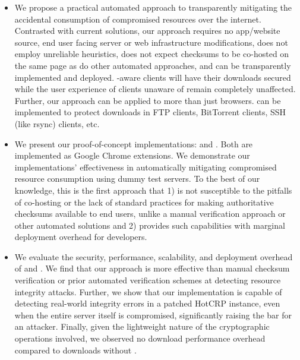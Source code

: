\begin{itemize}

  \item We propose a practical automated approach to transparently mitigating
  the accidental consumption of compromised resources over the internet.
  Contrasted with current solutions, our approach requires no app/website
  source, end user facing server or web infrastructure modifications, does not
  employ unreliable heuristics, does not expect checksums to be co-hosted on the
  same page as do other automated approaches, and can be transparently
  implemented and deployed. \SYSTEM{}-aware clients will have their downloads
  secured while the user experience of clients unaware of \SYSTEM{} remain
  completely unaffected. Further, our approach can be applied to more than just
  browsers. \SYSTEM{} can be implemented to protect downloads in FTP clients,
  BitTorrent clients, SSH (like rsync) clients, etc.

  \item We present our proof-of-concept \SYSTEM{} implementations: \DNSSYS{} and
  \DHTSYS{}. Both are implemented as Google Chrome extensions. We demonstrate
  our implementations' effectiveness in automatically mitigating compromised
  resource consumption using dummy test servers. To the best of our knowledge,
  this is the first approach that 1) is not susceptible to the pitfalls of
  co-hosting or the lack of standard practices for making authoritative
  checksums available to end users, unlike a manual verification approach or
  other automated solutions and 2) provides such capabilities with marginal
  deployment overhead for developers.

  \item We evaluate the security, performance, scalability, and deployment
  overhead of \DNSSYS{} and \DHTSYS{}. We find that our approach is more
  effective than manual checksum verification or prior automated verification
  schemes at detecting resource integrity attacks. Further, we show that our
  \DNSSYS{} implementation is capable of detecting real-world integrity errors
  in a patched HotCRP instance, even when the entire server itself is
  compromised, significantly raising the bar for an attacker. Finally, given the
  lightweight nature of the cryptographic operations involved, we observed no
  download performance overhead compared to downloads without \DNSSYS{}.

\end{itemize}
